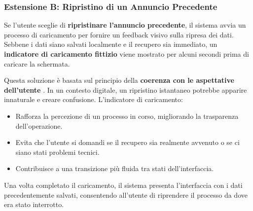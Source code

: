 \clearpage
\newpage
\subsubsection{Estensione B: Ripristino di un Annuncio Precedente}
Se l’utente sceglie di \textbf{ripristinare l’annuncio precedente}, il sistema avvia un processo di caricamento per fornire un feedback visivo sulla ripresa dei dati. Sebbene i dati siano salvati localmente e il recupero sia immediato, un \textbf{indicatore di caricamento fittizio} viene mostrato per alcuni secondi prima di caricare la schermata.

Questa soluzione è basata sul principio della \textbf{coerenza con le aspettative dell’utente} \cite{shneiderman2004}. In un contesto digitale, un ripristino istantaneo potrebbe apparire innaturale e creare confusione. L’indicatore di caricamento:
\begin{itemize}
    \item Rafforza la percezione di un processo in corso, migliorando la trasparenza dell’operazione.
    \item Evita che l’utente si domandi se il recupero sia realmente avvenuto o se ci siano stati problemi tecnici.
    \item Contribuisce a una transizione più fluida tra stati dell’interfaccia.
\end{itemize}

Una volta completato il caricamento, il sistema presenta l’interfaccia con i dati precedentemente salvati, consentendo all’utente di riprendere il processo da dove era stato interrotto.


